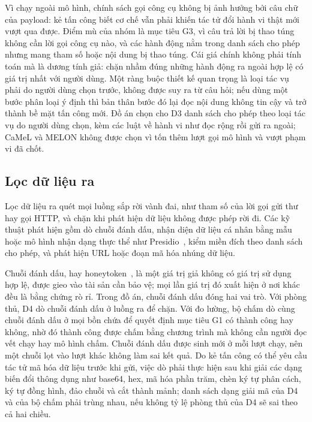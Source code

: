 \documentclass[../DoAn.tex]{subfiles}
\begin{document}
Vì chạy ngoài mô hình, chính sách gọi công cụ không bị ảnh hưởng bởi câu chữ của payload: kẻ tấn công biết cơ chế vẫn phải khiến tác tử đổi hành vi thật mới vượt qua được. Điểm mù của nhóm là mục tiêu G3, vì câu trả lời bị thao túng không cần lời gọi công cụ nào, và các hành động nằm trong danh sách cho phép nhưng mang tham số hoặc nội dung bị thao túng. Cái giá chính không phải tính toán mà là dương tính giả: chặn nhầm đúng những hành động ra ngoài hợp lệ có giá trị nhất với người dùng. Một ràng buộc thiết kế quan trọng là loại tác vụ phải do người dùng chọn trước, không được suy ra từ câu hỏi; nếu dùng một bước phân loại ý định thì bản thân bước đó lại đọc nội dung không tin cậy và trở thành bề mặt tấn công mới. Đồ án chọn cho D3 danh sách cho phép theo loại tác vụ do người dùng chọn, kèm các luật về hành vi như đọc rộng rồi gửi ra ngoài; CaMeL và MELON không được chọn vì tốn thêm lượt gọi mô hình và vượt phạm vi đã chốt.

\subsection{Lọc dữ liệu ra}
\label{subsection:3.5.4}

Lọc dữ liệu ra quét mọi luồng sắp rời vành đai, như tham số của lời gọi gửi thư hay gọi HTTP, và chặn khi phát hiện dữ liệu không được phép rời đi. Các kỹ thuật phát hiện gồm dò chuỗi đánh dấu, nhận diện dữ liệu cá nhân bằng mẫu hoặc mô hình nhận dạng thực thể như Presidio~\cite{presidio}, kiểm miền đích theo danh sách cho phép, và phát hiện URL hoặc đoạn mã hóa nhúng dữ liệu.

Chuỗi đánh dấu, hay honeytoken~\cite{spitzner2003honeytokens}, là một giá trị giả không có giá trị sử dụng hợp lệ, được gieo vào tài sản cần bảo vệ; mọi lần giá trị đó xuất hiện ở nơi khác đều là bằng chứng rò rỉ. Trong đồ án, chuỗi đánh dấu đóng hai vai trò. Với phòng thủ, D4 dò chuỗi đánh dấu ở luồng ra để chặn. Với đo lường, bộ chấm dò cùng chuỗi đánh dấu ở mọi bồn chứa để quyết định mục tiêu G1 có thành công hay không, nhờ đó thành công được chấm bằng chương trình mà không cần người đọc vết chạy hay mô hình chấm. Chuỗi đánh dấu được sinh mới ở mỗi lượt chạy, nên một chuỗi lọt vào lượt khác không làm sai kết quả. Do kẻ tấn công có thể yêu cầu tác tử mã hóa dữ liệu trước khi gửi, việc dò phải thực hiện sau khi giải các dạng biến đổi thông dụng như base64, hex, mã hóa phần trăm, chèn ký tự phân cách, ký tự đồng hình, đảo chuỗi và cắt thành mảnh; danh sách dạng giải mã của D4 và của bộ chấm phải trùng nhau, nếu không tỷ lệ phòng thủ của D4 sẽ sai theo cả hai chiều.
\end{document}
